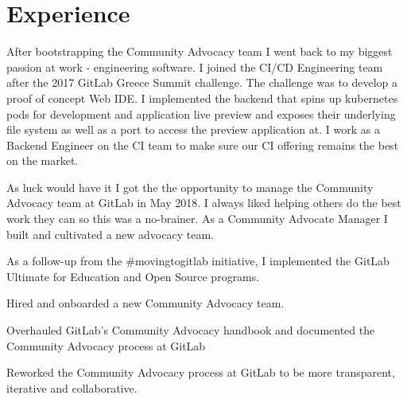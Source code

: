 \documentclass[]{matija-resume}
\begin{document}
\begin{minipage}[t]{0.66\textwidth}


\section{Experience}
\vspace{\topsep}
After bootstrapping the Community Advocacy team I went back to my biggest passion at work - engineering software. I joined the CI/CD Engineering team after the 2017 GitLab Greece Summit challenge. The challenge was to develop a proof of concept Web IDE. I implemented the backend that spins up kubernetes pods for development and application live preview and exposes their underlying file system as well as a port to access the preview application at. I work as a Backend Engineer on the CI team to make sure our CI offering remains the best on the market.
\sectionsep

\vspace{\topsep}
As luck would have it I got the the opportunity to manage the Community Advocacy team at GitLab in May 2018. I always liked helping others do the best work they can so this was a no-brainer. As a Community Advocate Manager I built and cultivated a new advocacy team.
\vspace{\topsep}
\begin{tightemize}
\item As a follow-up from the \#movingtogitlab initiative, I implemented the GitLab Ultimate for Education and Open Source programs.
\item Hired and onboarded a new Community Advocacy team.
\item Overhauled GitLab's Community Advocacy handbook and documented the Community Advocacy process at GitLab
\item Reworked the Community Advocacy process at GitLab to be more transparent, iterative and collaborative.
\end{tightemize}
\sectionsep


\end{minipage}
\end{document}
